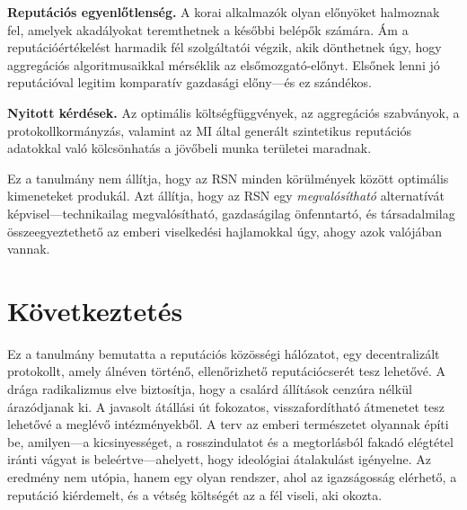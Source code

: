 \documentclass[11pt,a4paper,twocolumn]{article}
\begin{document}
\textbf{Reputációs egyenlőtlenség.} A korai alkalmazók olyan előnyöket halmoznak fel, amelyek akadályokat teremthetnek a későbbi belépők számára. Ám a reputációértékelést harmadik fél szolgáltatói végzik, akik dönthetnek úgy, hogy aggregációs algoritmusaikkal mérséklik az elsőmozgató-előnyt. Elsőnek lenni jó reputációval legitim komparatív gazdasági előny---és ez szándékos.

\textbf{Nyitott kérdések.} Az optimális költségfüggvények, az aggregációs szabványok, a protokollkormányzás, valamint az MI által generált szintetikus reputációs adatokkal való kölcsönhatás a jövőbeli munka területei maradnak.

Ez a tanulmány nem állítja, hogy az RSN minden körülmények között optimális kimeneteket produkál. Azt állítja, hogy az RSN egy \emph{megvalósítható} alternatívát képvisel---technikailag megvalósítható, gazdaságilag önfenntartó, és társadalmilag összeegyeztethető az emberi viselkedési hajlamokkal úgy, ahogy azok valójában vannak.

\section{Következtetés}

Ez a tanulmány bemutatta a reputációs közösségi hálózatot, egy decentralizált protokollt, amely álnéven történő, ellenőrizhető reputációcserét tesz lehetővé. A drága radikalizmus elve biztosítja, hogy a csalárd állítások cenzúra nélkül árazódjanak ki. A javasolt átállási út fokozatos, visszafordítható átmenetet tesz lehetővé a meglévő intézményekből. A terv az emberi természetet olyannak építi be, amilyen---a kicsinyességet, a rosszindulatot és a megtorlásból fakadó elégtétel iránti vágyat is beleértve---ahelyett, hogy ideológiai átalakulást igényelne. Az eredmény nem utópia, hanem egy olyan rendszer, ahol az igazságosság elérhető, a reputáció kiérdemelt, és a vétség költségét az a fél viseli, aki okozta.


\end{document}
